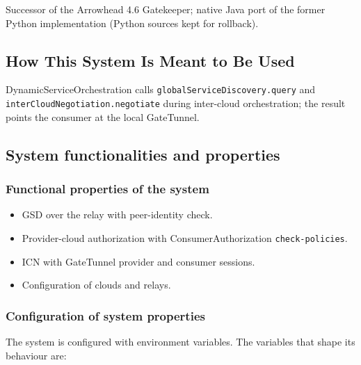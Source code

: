 \documentclass[a4paper]{arrowhead}
\begin{document}
Successor of the Arrowhead 4.6 Gatekeeper; native Java port of the former Python implementation (Python sources kept for rollback).

\subsection{How This System Is Meant to Be Used}
\label{sec:use}

Dynamic\allowbreak{}Service\allowbreak{}Orchestration calls \texttt{global\allowbreak{}Service\allowbreak{}Discovery.\allowbreak{}query} and \texttt{inter\allowbreak{}Cloud\allowbreak{}Negotiation.\allowbreak{}negotiate} during inter-cloud orchestration; the result points the consumer at the local GateTunnel.

\subsection{System functionalities and properties}
\label{sec:properties}

\subsubsection{Functional properties of the system}

\begin{itemize}
  \item GSD over the relay with peer-identity check.
  \item Provider-cloud authorization with Consumer\allowbreak{}Authorization \texttt{check-\allowbreak{}policies}.
  \item ICN with GateTunnel provider and consumer sessions.
  \item Configuration of clouds and relays.
\end{itemize}

\subsubsection{Configuration of system properties}

The system is configured with environment variables. The variables that shape its behaviour are:
\end{document}
